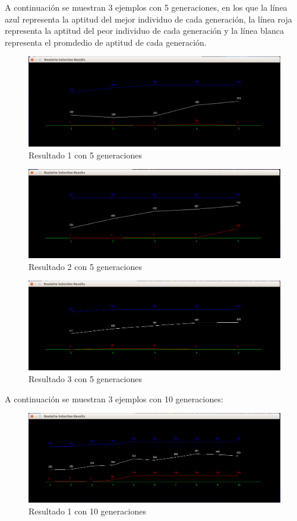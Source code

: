 \documentclass[11pt,letterpaper]{article}
\begin{document}
A continuación se muestran 3 ejemplos con 5 generaciones, en los que la línea azul representa la aptitud del mejor individuo de cada generación, la línea roja representa la aptitud del peor individuo de cada generación y la línea blanca representa el promdedio de aptitud de cada generación.
\begin{figure}[H]
	\centering
	\includegraphics[scale = 0.4]{images/5gen1}
	\caption{Resultado 1 con 5 generaciones}
\end{figure}

\begin{figure}[H]
	\centering
	\includegraphics[scale = 0.4]{images/5gen2}
	\caption{Resultado 2 con 5 generaciones}
\end{figure}

\begin{figure}[H]
	\centering
	\includegraphics[scale = 0.4]{images/5gen3}
	\caption{Resultado 3 con 5 generaciones}
\end{figure}

A continuación se muestran 3 ejemplos con 10 generaciones:
\begin{figure}[H]
	\centering
	\includegraphics[scale = 0.4]{images/10gen1}
	\caption{Resultado 1 con 10 generaciones}
\end{figure}
\end{document}
